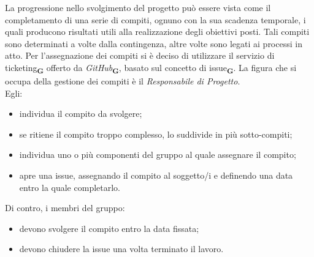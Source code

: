 La progressione nello svolgimento del progetto può essere vista come il completamento di una serie di compiti, ognuno con la sua scadenza temporale, i quali producono risultati utili alla realizzazione degli obiettivi posti. Tali compiti sono determinati a volte dalla contingenza, altre volte sono legati ai processi in atto. Per l’assegnazione dei compiti si è deciso di utilizzare il servizio di ticketing\textsubscript{\textbf{G}} offerto da \textit{GitHub}\textsubscript{\textbf{G}}, basato sul concetto di issue\textsubscript{\textbf{G}}. La figura che si occupa della gestione dei compiti è il \textit{Responsabile di Progetto}.\\
Egli:
\begin {itemize}
\item individua il compito da svolgere;
\item se ritiene il compito troppo complesso, lo suddivide in più sotto-compiti;
\item individua uno o più componenti del gruppo al quale assegnare il compito;
\item apre una issue, assegnando il compito al soggetto/i e definendo una data entro la quale completarlo.

\end {itemize}
Di contro, i membri del gruppo:
\begin {itemize}
\item devono svolgere il compito entro la data fissata;
\item devono chiudere la issue una volta terminato il lavoro.
\end {itemize}
